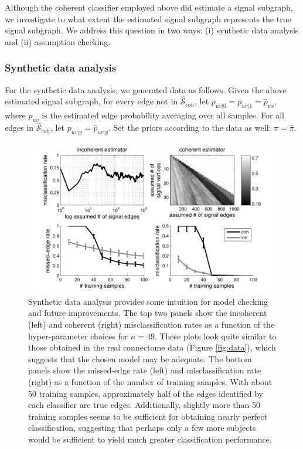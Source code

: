\documentclass[10pt,journal,cspaper,compsoc]{IEEEtran}
\providecommand{\mh}[1]{\hat{#1}}
\providecommand{\mhc}[1]{\hat{\mathcal{#1}}}
\begin{document}
Although the coherent classifier employed above did estimate a signal subgraph, we investigate to what extent the estimated signal subgraph represents the true signal subgraph.  We address this question in two ways:  (i) synthetic data analysis and (ii) assumption checking.  

\subsubsection{Synthetic data analysis} %
\label{ssub:synthetic_data_analysis}

For the synthetic data analysis, we generated data as follows.  Given the above estimated signal subgraph, for every edge not in $\mhc{S}_{coh}$, let $p_{uv|0}=p_{uv|1}=\mh{p}_{uv}$, where $\mh{p}_{uv}$ is the estimated edge probability averaging over all samples.  For all edges in $\mhc{S}_{coh}$, let $p_{uv|y}=\mh{p}_{uv|y}$.  Set the priors according to the data as well: $\pi=\mh{\pi}$.  

\begin{figure}[tb!]
	\centering
		\includegraphics[width=0.7\linewidth]{../figs/BLSA0317_Count_synthetic_Lhats.pdf}
	\caption{Synthetic data analysis provides some intuition for model checking and future improvements.  The top two panels show the incoherent (left) and coherent (right) misclassification rates as a function of the hyper-parameter choices for $n=49$.  These plots look quite similar to those obtained in the real connectome data (Figure \ref{fig:data}), which suggests that the chosen model may be adequate.  The bottom panels show the missed-edge rate (left) and misclassification rate (right) as a function of the number of training samples.  With about 50 training samples, approximately half of the edges identified by each classifier are true edges.  Additionally, slightly more than 50 training samples seems to be sufficient for obtaining nearly perfect classification, suggesting that perhaps only a few more subjects would be sufficient to yield much greater classification performance.}
	\label{fig:synthetic}
\end{figure}
\end{document}
